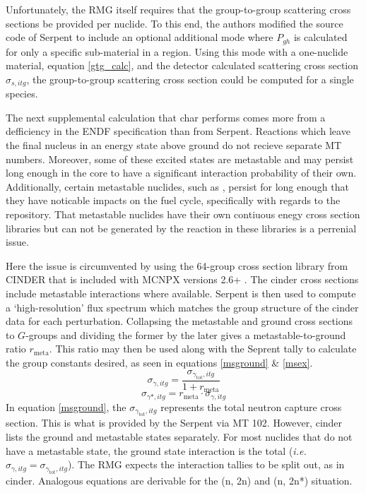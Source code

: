 Unfortunately, the RMG itself requires that the group-to-group scattering cross sections be provided 
per nuclide. To this end, the authors modified the source code of Serpent to include an optional 
additional mode where $P_{gh}$ is calculated for only a specific sub-material in a region.    
Using this mode with a one-nuclide material, equation \ref{gtg_calc}, and the detector calculated
scattering cross section $\sigma_{s,itg}$, the group-to-group scattering cross section could 
be computed for a single species.

The next supplemental calculation that char performs comes more from a defficiency in the 
ENDF specification than from Serpent.  Reactions which leave the final nucleus in an energy
state above ground do not recieve separate MT numbers.  Moreover, some of these excited states
are metastable and may persist long enough in the core to have a significant interaction 
probability of their own.  Additionally, certain metastable nuclides, such as \superscript{*},
persist for long enough that they have noticable impacts on the fuel cycle, specifically with regards to 
the repository.  That metastable nuclides have their own contiuous enegy cross section libraries
but can not be generated by the reaction in these libraries is a perrenial issue.

Here the issue is circumvented by using the 64-group cross section library from CINDER that is 
included with MCNPX versions 2.6+ \cite{Pelowitz2008}.  The cinder cross sections include metastable
interactions where available.  Serpent is then used to compute a `high-resolution' 
flux spectrum which matches the group structure of the cinder data for each perturbation.  
Collapsing the metastable and ground cross sections to $G$-groups and dividing the former by 
the later gives a metastable-to-ground ratio $r_{\mbox{meta}}$.  This ratio may then be used along with 
the Seprent tally to calculate the group constants desired, as seen in equations \ref{msground} \& 
\ref{msex}.
\begin{equation}
\label{msground}
\sigma_{\gamma,itg} = \frac{\sigma_{\gamma_{\mbox{tot}},itg}}{1 + r_{\mbox{meta}}}
\end{equation}
\begin{equation}
\label{msex}
\sigma_{\gamma*,itg} = r_{\mbox{meta}} \cdot \sigma_{\gamma,itg}
\end{equation}
In equation \ref{msground}, the $\sigma_{\gamma_{\mbox{tot}},itg}$ represents the total neutron
capture cross section.  This is what is provided by the Serpent via MT 102.  However, cinder 
lists the ground and metastable states separately.  For most nuclides that do not have a metastable state, the 
ground state interaction is the total (\emph{i.e.} $\sigma_{\gamma,itg} = \sigma_{\gamma_{\mbox{tot}},itg}$).
The RMG expects the interaction tallies to be split out, as in cinder.  Analogous equations are 
derivable for the (n, 2n) and (n, 2n*) situation.

